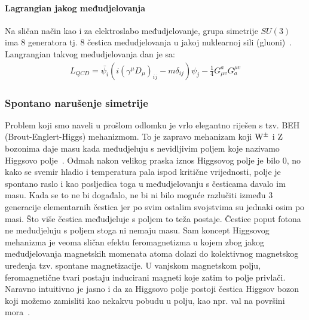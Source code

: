 \documentclass[12pt,a4paper,oneside]{article}
\begin{document}
\begin{linenumbers}
		\paragraph{Lagrangian jakog međudjelovanja\newline}
		Na sličan način kao i za elektroslabo međudjelovanje, grupa simetrije \begin{math}
		SU(3) 
		\end{math} ima 8 generatora tj. 8 čestica međudjelovanja u jakoj nuklearnoj sili (gluoni)~\cite{doktorat}. Langrangian takvog međudjelovanja dan je sa:
		\begin{equation}\label{eq:2}
		\begin{split}
		L_{QCD} = \bar{\psi_i}(i{(\gamma^\mu D_\mu)}_{ij} - m\delta_{ij})\psi_j - \frac{1}{4} G^a_{\mu v}G^{\mu v}_a 
		\end{split}
		\end{equation}
		
		
		
		\subsubsection{Spontano narušenje simetrije}
		Problem koji smo naveli u prošlom odlomku je vrlo elegantno riješen s tzv. BEH (Brout-Englert-Higgs) mehanizmom. To je zapravo mehanizam koji $\rm{W}^{\pm}$ i Z bozonima daje masu kada međudjeluju s nevidljivim poljem koje nazivamo Higgsovo polje~\cite{cernweb}. Odmah nakon velikog praska iznos Higgsovog polje je bilo 0, no kako se svemir hladio i temperatura pala ispod kritične vrijednosti, polje je spontano raslo i kao posljedica toga u međudjelovanju s česticama davalo im masu. Kada se to ne bi događalo, ne bi ni bilo moguće razlučiti između 3 generacije elementarnih čestica jer po svim ostalim svojstvima su jednaki osim po masi. Što više čestica međudjeluje s poljem to teža postaje. Čestice poput fotona ne međudjeluju s poljem stoga ni nemaju masu.
		Sam koncept Higgsovog mehanizma je veoma sličan efektu feromagnetizma u kojem zbog jakog međudjelovanja magnetskih momenata atoma dolazi do kolektivnog magnetskog uređenja tzv. spontane magnetizacije. U  vanjskom magnetskom polju, feromagnetične tvari postaju inducirani magneti koje zatim to polje privlači.  
		Naravno intuitivno je jasno i da za Higgsovo polje postoji čestica Higgsov bozon koji možemo zamisliti kao nekakvu pobudu u polju, kao npr. val na površini mora~\cite{cernweb}. 
		

\end{linenumbers}
\end{document}
